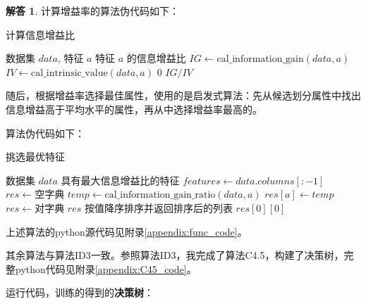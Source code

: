 \documentclass[a4paper,UTF8]{article}
\numberwithin{equation}{section}
\theoremstyle{definition}
\newtheorem*{solution}{解答}
\begin{document}
\begin{solution}
计算增益率的算法伪代码如下：

\begin{algorithm}[H]
\caption{计算信息增益比}
\begin{algorithmic}[1]
\Require 数据集 $data$, 特征 $a$
\Ensure 特征 $a$ 的信息增益比
\State $IG \gets \text{cal\_information\_gain}(data, a)$
\State $IV \gets \text{cal\_intrinsic\_value}(data, a)$
    \State \Return $0$
\Else
    \State \Return $IG / IV$
\EndIf
\end{algorithmic}
\end{algorithm}

随后，根据增益率选择最佳属性，使用的是启发式算法：先从候选划分属性中找出信息增益高于平均水平的属性，再从中选择增益率最高的。

\vspace{8pt}

算法伪代码如下：

\begin{algorithm}[H]
\caption{挑选最优特征}
\begin{algorithmic}[1]
\Require 数据集 $data$
\Ensure 具有最大信息增益比的特征
\State $features \gets data.columns[:-1]$
\State $res \gets \text{空字典}$ 
    \State $temp \gets \text{cal\_information\_gain\_ratio}(data, a)$
    \State $res[a] \gets temp$
\EndFor
\State $res \gets \text{对字典 $res$ 按值降序排序并返回排序后的列表}$
\State \Return $res[0][0]$ 
\end{algorithmic}
\end{algorithm}

上述算法的python源代码见附录\ref{appendix:func_code}。

其余算法与算法ID3一致。参照算法ID3，我完成了算法C4.5，构建了决策树，完整python代码见附录\ref{appendix:C45_code}。

\vspace{6pt}

运行代码，训练的得到的\textbf{决策树}：

\begin{figure}[H]
    \centering
    \begin{tikzpicture}
      [level distance=8em,
      node style1/.style={draw, rectangle, rounded corners, align=center, minimum width=4em, minimum height=2em, fill=blue!10},
      node style2/.style={draw, ellipse, align=center, fill=green!10, minimum width=2em, minimum height=1em},
      node style3/.style={draw, ellipse, align=center, fill=red!10, minimum width=2em, minimum height=1em},
      edge from parent/.style={draw, thick},
      edge from parent node/.style={fill=none, inner sep=1pt, draw=none},
      ]
    

\end{tikzpicture}
\end{figure}
\end{solution}
\end{document}
